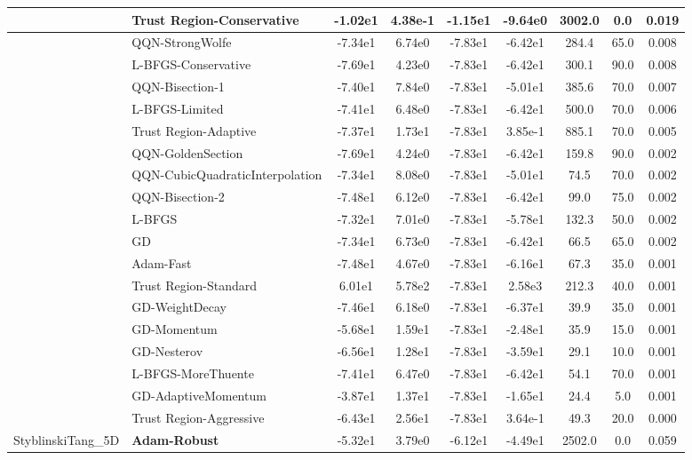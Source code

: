 \documentclass[10pt]{article}
\begin{document}
\begin{longtable}{|l|l|c|c|c|c|c|c|c|}
\hline
 & Trust Region-Conservative & -1.02e1 & 4.38e-1 & -1.15e1 & -9.64e0 & 3002.0 & 0.0 & 0.019 \\
\hline
 & QQN-StrongWolfe & -7.34e1 & 6.74e0 & -7.83e1 & -6.42e1 & 284.4 & 65.0 & 0.008 \\
\hline
 & L-BFGS-Conservative & -7.69e1 & 4.23e0 & -7.83e1 & -6.42e1 & 300.1 & 90.0 & 0.008 \\
\hline
 & QQN-Bisection-1 & -7.40e1 & 7.84e0 & -7.83e1 & -5.01e1 & 385.6 & 70.0 & 0.007 \\
\hline
 & L-BFGS-Limited & -7.41e1 & 6.48e0 & -7.83e1 & -6.42e1 & 500.0 & 70.0 & 0.006 \\
\hline
 & Trust Region-Adaptive & -7.37e1 & 1.73e1 & -7.83e1 & 3.85e-1 & 885.1 & 70.0 & 0.005 \\
\hline
 & QQN-GoldenSection & -7.69e1 & 4.24e0 & -7.83e1 & -6.42e1 & 159.8 & 90.0 & 0.002 \\
\hline
 & QQN-CubicQuadraticInterpolation & -7.34e1 & 8.08e0 & -7.83e1 & -5.01e1 & 74.5 & 70.0 & 0.002 \\
\hline
 & QQN-Bisection-2 & -7.48e1 & 6.12e0 & -7.83e1 & -6.42e1 & 99.0 & 75.0 & 0.002 \\
\hline
 & L-BFGS & -7.32e1 & 7.01e0 & -7.83e1 & -5.78e1 & 132.3 & 50.0 & 0.002 \\
\hline
 & GD & -7.34e1 & 6.73e0 & -7.83e1 & -6.42e1 & 66.5 & 65.0 & 0.002 \\
\hline
 & Adam-Fast & -7.48e1 & 4.67e0 & -7.83e1 & -6.16e1 & 67.3 & 35.0 & 0.001 \\
\hline
 & Trust Region-Standard & 6.01e1 & 5.78e2 & -7.83e1 & 2.58e3 & 212.3 & 40.0 & 0.001 \\
\hline
 & GD-WeightDecay & -7.46e1 & 6.18e0 & -7.83e1 & -6.37e1 & 39.9 & 35.0 & 0.001 \\
\hline
 & GD-Momentum & -5.68e1 & 1.59e1 & -7.83e1 & -2.48e1 & 35.9 & 15.0 & 0.001 \\
\hline
 & GD-Nesterov & -6.56e1 & 1.28e1 & -7.83e1 & -3.59e1 & 29.1 & 10.0 & 0.001 \\
\hline
 & L-BFGS-MoreThuente & -7.41e1 & 6.47e0 & -7.83e1 & -6.42e1 & 54.1 & 70.0 & 0.001 \\
\hline
 & GD-AdaptiveMomentum & -3.87e1 & 1.37e1 & -7.83e1 & -1.65e1 & 24.4 & 5.0 & 0.001 \\
\hline
 & Trust Region-Aggressive & -6.43e1 & 2.56e1 & -7.83e1 & 3.64e-1 & 49.3 & 20.0 & 0.000 \\
StyblinskiTang\_5D & \textbf{Adam-Robust} & -5.32e1 & 3.79e0 & -6.12e1 & -4.49e1 & 2502.0 & 0.0 & 0.059 \\

\end{longtable}
\end{document}
